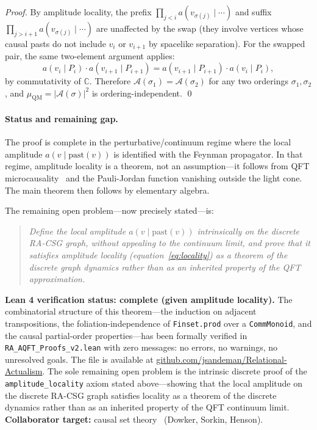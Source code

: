 \documentclass[11pt,a4paper]{article}
\theoremstyle{plain}
\theoremstyle{definition}
\theoremstyle{remark}
\newcommand{\muC}{\mu_{\mathrm{QM}}}   %
\begin{document}
\begin{description}
\begin{proof}
  By amplitude locality, the prefix $\prod_{j<i} a(v_{\sigma(j)} \mid \cdots)$
  and suffix $\prod_{j>i+1} a(v_{\sigma(j)} \mid \cdots)$ are unaffected by the
  swap (they involve vertices whose causal pasts do not include $v_i$ or
  $v_{i+1}$ by spacelike separation). For the swapped pair, the same two-element
  argument applies:
  \begin{equation}
    a(v_i \mid P_i) \cdot a(v_{i+1} \mid P_{i+1})
    = a(v_{i+1} \mid P_{i+1}) \cdot a(v_i \mid P_i),
  \end{equation}
  by commutativity of $\mathbb{C}$. Therefore $\mathcal{A}(\sigma_1) =
  \mathcal{A}(\sigma_2)$ for any two orderings $\sigma_1, \sigma_2$, and
  $\muC = |\mathcal{A}(\sigma)|^2$ is ordering-independent. \qed
  \end{proof}

  \paragraph{Status and remaining gap.}
  The proof is complete in the perturbative/continuum regime where the local
  amplitude $a(v \mid \mathrm{past}(v))$ is identified with the Feynman
  propagator. In that regime, amplitude locality is a theorem, not an
  assumption---it follows from QFT microcausality~\citep{Haag1996} and the
  Pauli-Jordan function vanishing outside the light cone. The main theorem
  then follows by elementary algebra.

  The remaining open problem---now precisely stated---is:
  \begin{quotation}
  \noindent\textit{Define the local amplitude $a(v \mid \mathrm{past}(v))$
  intrinsically on the discrete RA-CSG graph, without appealing to the
  continuum limit, and prove that it satisfies amplitude locality
  (equation~\eqref{eq:locality}) as a theorem of the discrete graph dynamics
  rather than as an inherited property of the QFT approximation.}
  \end{quotation}
  \textbf{Lean 4 verification status: complete (given amplitude locality).}
  The combinatorial structure of this theorem---the induction on adjacent
  transpositions, the foliation-independence of \texttt{Finset.prod} over a
  \texttt{CommMonoid}, and the causal partial-order properties---has been
  formally verified in \texttt{RA\_AQFT\_Proofs\_v2.lean} with zero messages:
  no errors, no warnings, no unresolved goals. The file is available at
  \href{https://github.com/jsandeman/Relational-Actualism}{github.com/jsandeman/Relational-Actualism}.
  The sole remaining open problem is the intrinsic discrete proof of the
  \texttt{amplitude\_locality} axiom stated above---showing that the local
  amplitude on the discrete RA-CSG graph satisfies locality as a theorem
  of the discrete dynamics rather than as an inherited property of the QFT
  continuum limit.
  \textbf{Collaborator target:} causal set theory~\citep{Dowker2005,RideoutSorkin2000} (Dowker, Sorkin, Henson).


\end{description}
\end{document}
